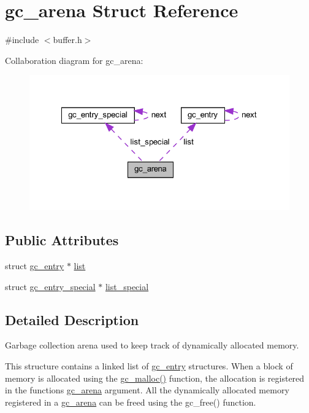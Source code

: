 \hypertarget{structgc__arena}{}\section{gc\+\_\+arena Struct Reference}
\label{structgc__arena}


{\ttfamily \#include $<$buffer.\+h$>$}



Collaboration diagram for gc\+\_\+arena\+:
\nopagebreak
\begin{figure}[H]
\begin{center}
\leavevmode
\includegraphics[width=322pt]{structgc__arena__coll__graph}
\end{center}
\end{figure}
\subsection*{Public Attributes}
\begin{DoxyCompactItemize}
\item 
struct \hyperlink{structgc__entry}{gc\+\_\+entry} $\ast$ \hyperlink{structgc__arena_a88f958412dce42ad5ab9ca27bfb40d4f}{list}
\item 
struct \hyperlink{structgc__entry__special}{gc\+\_\+entry\+\_\+special} $\ast$ \hyperlink{structgc__arena_a31784b2c6728308bae3acc81e2a25a11}{list\+\_\+special}
\end{DoxyCompactItemize}


\subsection{Detailed Description}
Garbage collection arena used to keep track of dynamically allocated memory.

This structure contains a linked list of {\ttfamily \hyperlink{structgc__entry}{gc\+\_\+entry}} structures. When a block of memory is allocated using the {\ttfamily \hyperlink{buffer_8c_a67f7dec7f86e113dc0744584fd80b621}{gc\+\_\+malloc()}} function, the allocation is registered in the function\textquotesingle{}s {\ttfamily \hyperlink{structgc__arena}{gc\+\_\+arena}} argument. All the dynamically allocated memory registered in a {\ttfamily \hyperlink{structgc__arena}{gc\+\_\+arena}} can be freed using the {\ttfamily gc\+\_\+free()} function. 

